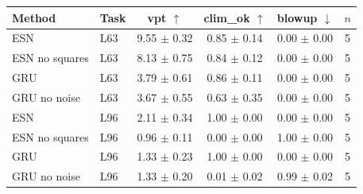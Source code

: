 \begin{tabular}{llcccc}
\toprule
Method & Task & vpt $\uparrow$ & clim\_ok $\uparrow$ & blowup $\downarrow$ & $n$ \\
\midrule
ESN & L63 & 9.55 $\pm$ 0.32 & 0.85 $\pm$ 0.14 & 0.00 $\pm$ 0.00 & 5 \\
ESN no squares & L63 & 8.13 $\pm$ 0.75 & 0.84 $\pm$ 0.12 & 0.00 $\pm$ 0.00 & 5 \\
GRU & L63 & 3.79 $\pm$ 0.61 & 0.86 $\pm$ 0.11 & 0.00 $\pm$ 0.00 & 5 \\
GRU no noise & L63 & 3.67 $\pm$ 0.55 & 0.63 $\pm$ 0.35 & 0.00 $\pm$ 0.00 & 5 \\
\midrule
ESN & L96 & 2.11 $\pm$ 0.34 & 1.00 $\pm$ 0.00 & 0.00 $\pm$ 0.00 & 5 \\
ESN no squares & L96 & 0.96 $\pm$ 0.11 & 0.00 $\pm$ 0.00 & 1.00 $\pm$ 0.00 & 5 \\
GRU & L96 & 1.33 $\pm$ 0.23 & 1.00 $\pm$ 0.00 & 0.00 $\pm$ 0.00 & 5 \\
GRU no noise & L96 & 1.33 $\pm$ 0.20 & 0.01 $\pm$ 0.02 & 0.99 $\pm$ 0.02 & 5 \\
\bottomrule
\end{tabular}
